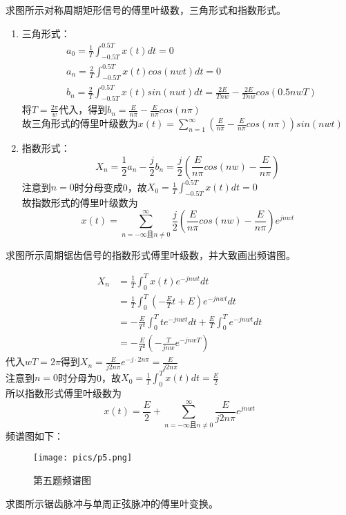 \documentclass[answers]{exam}  %
\begin{document}
\begin{questions}
\newpage
\question 求图所示对称周期矩形信号的傅里叶级数，三角形式和指数形式。



\begin{solution}
	\begin{enumerate}
		\item 三角形式：
		\begin{align*}
			&a_0=\frac{1}{T}\int_{-0.5T}^{0.5T}x(t)dt=0\\
			&a_n=\frac{2}{T}\int_{-0.5T}^{0.5T}x(t)cos(nwt)dt=0\\
			&b_n=\frac{2}{T}\int_{-0.5T}^{0.5T}x(t)sin(nwt)dt=\frac{2E}{Tnw}-\frac{2E}{Tnw}cos(0.5nwT)
		\end{align*}
		将$T=\frac{2\pi}{w}$代入，得到$b_n=\frac{E}{n\pi}-\frac{E}{n\pi}cos(n\pi)$\\
		故三角形式的傅里叶级数为$x(t)=\sum\limits_{n=1}^{\infty}(\frac{E}{n\pi}-\frac{E}{n\pi}cos(n\pi))sin(nwt)$
		\item 指数形式：
			$$X_n=\frac{1}{2}a_n-\frac{j}{2}b_n=\frac{j}{2}(\frac{E}{n\pi}cos(nw)-\frac{E}{n\pi})$$
			注意到$n=0$时分母变成0，故$X_0=\frac{1}{T}\int_{-0.5T}^{0.5T}x(t)dt=0$\\
			故指数形式的傅里叶级数为$$x(t)=\sum\limits_{n=-\infty\mbox{且}n\not=0}^{\infty}\frac{j}{2}(\frac{E}{n\pi}cos(nw)-\frac{E}{n\pi})e^{jnwt}$$

	\end{enumerate}
\end{solution}
\newpage
\question 求图所示周期锯齿信号的指数形式傅里叶级数，并大致画出频谱图。


\begin{solution}
	\begin{align*}
		X_n&=\frac{1}{T}\int_0^Tx(t)e^{-jnwt}dt\\
		&=\frac{1}{T}\int_0^T(-\frac{E}{T}t+E)e^{-jnwt}dt\\
		&=-\frac{E}{T^2}\int_0^Tte^{-jnwt}dt+\frac{E}{T}\int_0^Te^{-jnwt}dt\\
		&=-\frac{E}{T^2}(-\frac{T}{jnw}e^{-jnwT})
	\end{align*}
	代入$wT=2\pi$得到$X_n=\frac{E}{j2n\pi}e^{-j\cdot 2n\pi}=\frac{E}{j2n\pi}$\\
	注意到$n=0$时分母为0，故$X_0=\frac{1}{T}\int_0^Tx(t)dt=\frac{E}{2}$\\
	所以指数形式傅里叶级数为$$x(t)=\frac{E}{2}+\sum\limits_{n=-\infty\mbox{且}n\not=0}^\infty\frac{E}{j2n\pi}e^{jnwt}$$
	频谱图如下：
\end{solution}
\begin{figure}[h]
	\centering
	\texttt{[image: pics/p5.png]}
	\caption{第五题频谱图}
\end{figure}
\newpage
\question 求图所示锯齿脉冲与单周正弦脉冲的傅里叶变换。



\end{questions}
\end{document}
